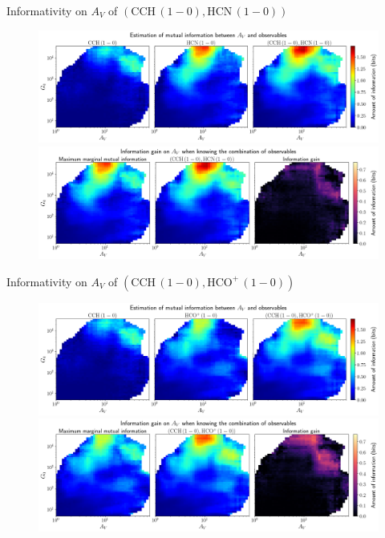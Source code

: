 \documentclass{beamer}
\begin{document}
\begin{frame}{Informativity on $A_V$ of $\left(\mathrm{CCH\,(1-0)},\mathrm{HCN\,(1-0)}\right)$}
    \begin{figure}
        \centering
        \includegraphics[width=0.95\linewidth]{../mi/av__cch10_hcn10_mi.png}
        \vfill
        \includegraphics[width=0.95\linewidth]{../mi/av__cch10_hcn10_mi_gain.png}
    \end{figure}
\end{frame}

\begin{frame}{Informativity on $A_V$ of $\left(\mathrm{CCH\,(1-0)},\mathrm{HCO^+\,(1-0)}\right)$}
    \begin{figure}
        \centering
        \includegraphics[width=0.95\linewidth]{../mi/av__cch10_hcop10_mi.png}
        \vfill
        \includegraphics[width=0.95\linewidth]{../mi/av__cch10_hcop10_mi_gain.png}
    \end{figure}
\end{frame}
\end{document}
